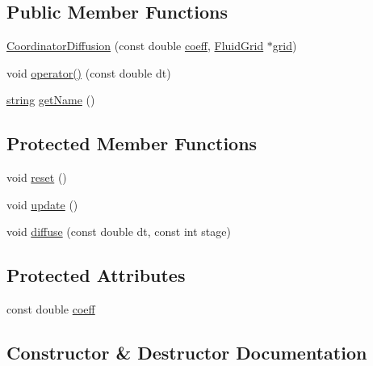 \subsection*{Public Member Functions}
\begin{DoxyCompactItemize}
\item 
\hyperlink{class_coordinator_diffusion_acd96f26a0bc606db956886cc77d7b4fa}{Coordinator\+Diffusion} (const double \hyperlink{class_coordinator_diffusion_a8e1ee974d96ba320f26bcf7197e959fe}{coeff}, \hyperlink{_definitions_8h_aff3288a3741f5098bcc456bb13440189}{Fluid\+Grid} $\ast$\hyperlink{class_generic_coordinator_aa514bbf7394bb5519c6f12daa33a375a}{grid})
\item 
void \hyperlink{class_coordinator_diffusion_a110e64039f79bcc6f0bfd430cb1f8c53}{operator()} (const double dt)
\item 
\hyperlink{testfpzip_8cpp_a984bb8e04129c4268bd6ff36a50c9fa4}{string} \hyperlink{class_coordinator_diffusion_ae06bddc3554895dbd7ebdf9218dfbd20}{get\+Name} ()
\end{DoxyCompactItemize}
\subsection*{Protected Member Functions}
\begin{DoxyCompactItemize}
\item 
void \hyperlink{class_coordinator_diffusion_a496dde2de4c2ca2fe4d19dad33d2e93e}{reset} ()
\item 
void \hyperlink{class_coordinator_diffusion_aa3c7fd1a3955f9f5358e093b296992a0}{update} ()
\item 
void \hyperlink{class_coordinator_diffusion_ae80d7775fcabdcd9934262ff2c7cf1b5}{diffuse} (const double dt, const int stage)
\end{DoxyCompactItemize}
\subsection*{Protected Attributes}
\begin{DoxyCompactItemize}
\item 
const double \hyperlink{class_coordinator_diffusion_a8e1ee974d96ba320f26bcf7197e959fe}{coeff}
\end{DoxyCompactItemize}


\subsection{Constructor \& Destructor Documentation}
\hypertarget{class_coordinator_diffusion_acd96f26a0bc606db956886cc77d7b4fa}{}
